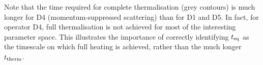 Note that the time required for complete thermalisation (grey contours) is much longer for D4 (momentum-suppressed scattering) than for D1 and D5. In fact, for operator D4, full thermalisation is not achieved for most of the interesting parameter space. This illustrates the importance of correctly identifying $t_{\rm eq}$ as the timescale on which full heating is achieved, rather than the much longer $t_{\rm therm}$. 


  